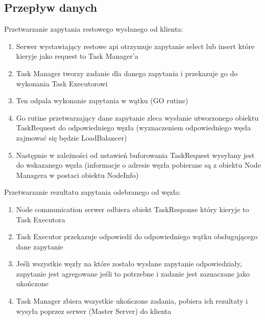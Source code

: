 \documentclass[paper=a4, fontsize=11pt]{scrartcl} %
\numberwithin{equation}{section} %
\numberwithin{figure}{section} %
\numberwithin{table}{section} %
\begin{document}
	\subsection{Przepływ danych}
		Przetwarzanie zapytania restowego wysłanego od klienta:
		\begin{enumerate}
			\item Serwer wystawiający restowe api otrzymuje zapytanie select lub insert które kieryje jako request to Task Manager'a
			\item Task Manager tworzy zadanie dla danego zapytania i przekazuje go do wykonania Task Executorowi
			\item Ten odpala wykonanie zapytania w wątku (GO rutine)
			\item Go rutine przetwarzający dane zapytanie zleca wysłanie utworzonego obiektu TaskRequest do odpowiedniego węzła 
				(wyznaczeniem odpowiedniego węsła zajmować się będzie LoadBalancer)
			\item Następnie w zależności od ustawień buforowania TaskRequest wysyłany jest do wskazanego węzła 
				(informacje o adresie węzła pobierane są z obiektu Node Managera w postaci obiektu NodeInfo)
		\end{enumerate}
		Przetwarzanie rezultatu zapytania odebranego od węzła:
		\begin{enumerate}
			\item Node communication serwer odbiera obiekt TaskResponse który kieryje to Task Executora
			\item Task Executor przekazuje odpowiedź do odpowiedniego wątku obsługującego dane zapytanie
			\item Jeśli wszystkie węzły na które zostało wysłane zapytanie odpowiedziały, zapytanie jest agregowane jeśli to 
				potrzebne i zadanie jest zaznaczane jako ukończone
			\item Task Manager zbiera wszystkie ukończone zadania, pobiera ich rezultaty i wysyła poprzez serwer (Master Server) do klienta
		\end{enumerate}
\end{document}

